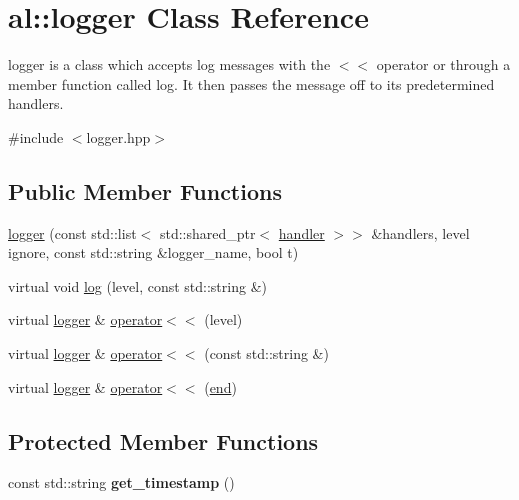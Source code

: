 \hypertarget{classal_1_1logger}{\section{al\-:\-:logger \-Class \-Reference}
\label{classal_1_1logger}
}


logger is a class which accepts log messages with the $<$$<$ operator or through a member function called log. \-It then passes the message off to its predetermined handlers.  




{\ttfamily \#include $<$logger.\-hpp$>$}

\subsection*{\-Public \-Member \-Functions}
\begin{DoxyCompactItemize}
\item 
\hyperlink{classal_1_1logger_a3cadf9937463b65343f29459a59bf564}{logger} (const std\-::list$<$ std\-::shared\-\_\-ptr$<$ \hyperlink{classal_1_1handler}{handler} $>$$>$ \&handlers, level ignore, const std\-::string \&logger\-\_\-name, bool t)
\item 
virtual void \hyperlink{classal_1_1logger_a4b0997a0f58aa36f7bb3e18826f3bf19}{log} (level, const std\-::string \&)
\item 
virtual \hyperlink{classal_1_1logger}{logger} \& \hyperlink{classal_1_1logger_aa95776ee6cf9af0a50ad12da5670f28f}{operator$<$$<$} (level)
\item 
virtual \hyperlink{classal_1_1logger}{logger} \& \hyperlink{classal_1_1logger_a3b5dfbc33c27b16367d6154c99f751b2}{operator$<$$<$} (const std\-::string \&)
\item 
virtual \hyperlink{classal_1_1logger}{logger} \& \hyperlink{classal_1_1logger_add696d93a24662bc71658703e52e134f}{operator$<$$<$} (\hyperlink{classal_1_1end}{end})
\end{DoxyCompactItemize}
\subsection*{\-Protected \-Member \-Functions}
\begin{DoxyCompactItemize}
\item 
\hypertarget{classal_1_1logger_a5016f7ad5c219d820d801bd70dd9d6d1}{const std\-::string {\bfseries get\-\_\-timestamp} ()}\label{classal_1_1logger_a5016f7ad5c219d820d801bd70dd9d6d1}

\end{DoxyCompactItemize}


